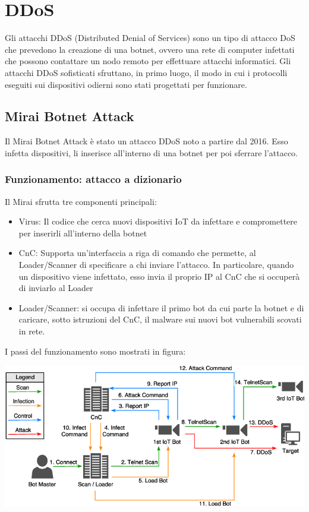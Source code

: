 \section{DDoS}
Gli attacchi DDoS (Distributed Denial of Services) sono un tipo di attacco DoS che prevedono la creazione di una botnet, ovvero una rete di computer infettati che possono contattare un nodo remoto per effettuare attacchi informatici. Gli attacchi DDoS sofisticati sfruttano, in primo luogo, il modo in cui i protocolli eseguiti sui dispositivi odierni sono stati progettati per funzionare.

\subsection{Mirai Botnet Attack}
Il Mirai Botnet Attack è stato un attacco DDoS noto a partire dal 2016. Esso infetta dispositivi, li inserisce all'interno di una botnet per poi sferrare l'attacco. 

\subsubsection{Funzionamento: attacco a dizionario}
Il Mirai sfrutta tre componenti principali:
\begin{itemize}
    \item Virus: Il codice che cerca nuovi dispositivi IoT da infettare e compromettere per inserirli all'interno della botnet 
    \item CnC: Supporta un'interfaccia a riga di comando che permette, al Loader/Scanner di specificare a chi inviare l'attacco. In particolare, quando un dispositivo viene infettato, esso invia il proprio IP al CnC che si occuperà di inviarlo al Loader
    \item Loader/Scanner: si occupa di infettare il primo bot da cui parte la botnet e di caricare, sotto istruzioni del CnC, il malware sui nuovi bot vulnerabili scovati in rete. 
\end{itemize}

I passi del funzionamento sono mostrati in figura:

\includegraphics[scale=0.4]{UNINA_MSc_Thesis_Project/img/Mirai-Botnet-Infection-Methodology.png}

